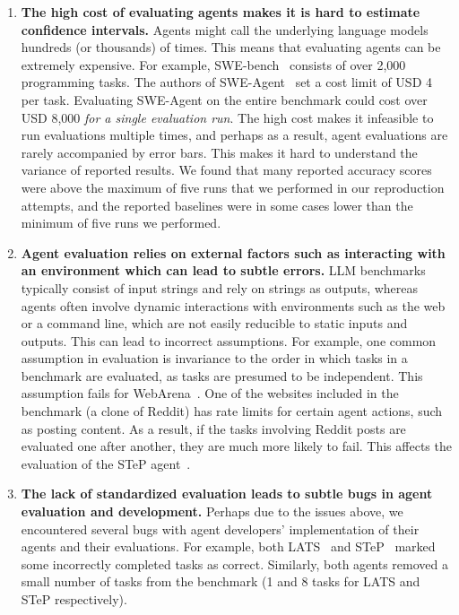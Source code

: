 \documentclass{article}
\begin{document}
\begin{enumerate}[leftmargin=*]
    \item \textbf{The high cost of evaluating agents makes it is hard to estimate confidence intervals.} Agents might call the underlying language models hundreds (or thousands) of times. This means that evaluating agents can be extremely expensive. For example, SWE-bench~\citep{jimenez_swe-bench_2023} consists of over 2,000 programming tasks. The authors of SWE-Agent~\citep{yang_swe-agent_2024} set a cost limit of USD 4 per task. Evaluating SWE-Agent on the entire benchmark could cost over USD 8,000 \textit{for a single evaluation run}. The high cost makes it infeasible to run evaluations multiple times, and perhaps as a result, agent evaluations are rarely accompanied by error bars. This makes it hard to understand the variance of reported results. We found that many reported accuracy scores were above the maximum of five runs that we performed in our reproduction attempts, and the reported baselines were in some cases lower than the minimum of five runs we performed. 
    \item \textbf{Agent evaluation relies on external factors such as interacting with an environment which can lead to subtle errors.} LLM benchmarks typically consist of input strings and rely on strings as outputs, whereas agents often involve dynamic interactions with environments such as the web or a command line, which are not easily reducible to static inputs and outputs. This can lead to incorrect assumptions. For example, one common assumption in evaluation is invariance to the order in which tasks in a benchmark are evaluated, as tasks are presumed to be independent. This assumption fails for WebArena~\citep{zhou_webarena_2024}. One of the websites included in the benchmark (a clone of Reddit) has rate limits for certain agent actions, such as posting content. As a result, if the tasks involving Reddit posts are evaluated one after another, they are much more likely to fail. This affects the evaluation of the STeP agent~\citep{sodhi_step_2024}.

    \item \textbf{The lack of standardized evaluation leads to subtle bugs in agent evaluation and development.} Perhaps due to the issues above, we encountered several bugs with agent developers' implementation of their agents and their evaluations. For example, both LATS~\citep{zhou_language_2023} and STeP~\citep{sodhi_step_2024} marked some incorrectly completed tasks as correct. Similarly, both agents removed a small number of tasks from the benchmark (1 and 8 tasks for LATS and STeP respectively).
\end{enumerate}
\end{document}
